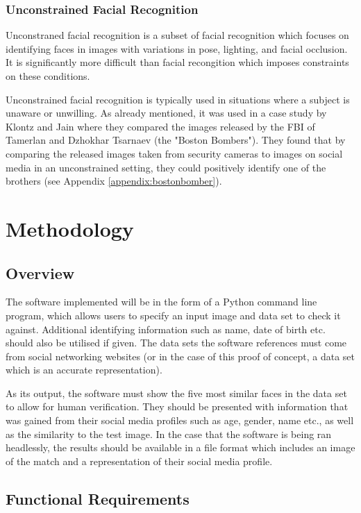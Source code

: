 \documentclass{article}
\begin{document}
\subsubsection{Unconstrained Facial Recognition}
Unconstraned facial recognition is a subset of facial recognition which focuses on identifying faces in images with variations in pose, lighting, and facial occlusion. It is significantly more difficult than facial recongition which imposes constraints on these conditions.

Unconstrained facial recognition is typically used in situations where a subject is unaware or unwilling. As already mentioned, it was used in a case study by Klontz and Jain where they compared the images released by the FBI of Tamerlan and Dzhokhar Tsarnaev (the "Boston Bombers"). They found that by comparing the released images taken from security cameras to images on social media in an unconstrained setting, they could positively identify one of the brothers \citep{bostonbombingcasestudy} (see Appendix \ref{appendix:bostonbomber}).

\newpage
\section{Methodology}
\subsection{Overview}
The software implemented will be in the form of a Python command line program, which allows users to specify an input image and data set to check it against. Additional identifying information such as name, date of birth etc. should also be utilised if given. The data sets the software references must come from social networking websites (or in the case of this proof of concept, a data set which is an accurate representation).

As its output, the software must show the five most similar faces in the data set to allow for human verification. They should be presented with information that was gained from their social media profiles such as age, gender, name etc., as well as the similarity to the test image. In the case that the software is being ran headlessly, the results should be available in a file format which includes an image of the match and a representation of their social media profile.

\subsection{Functional Requirements}
\end{document}

